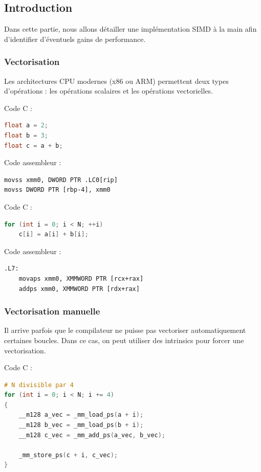\subsection{Introduction}

Dans cette partie, nous allons détailler une implémentation SIMD à la main afin d'identifier d'éventuels gains de performance.

\subsubsection{Vectorisation}

Les architectures CPU modernes (x86 ou ARM) permettent deux types d'opérations :
les opérations scalaires et les opérations vectorielles.

Code C :

\begin{lstlisting}[language=C]
float a = 2;
float b = 3;
float c = a + b;
\end{lstlisting}

Code assembleur :

\begin{lstlisting}
movss xmm0, DWORD PTR .LC0[rip]
movss DWORD PTR [rbp-4], xmm0
\end{lstlisting}

Code C :

\begin{lstlisting}[language=C]
for (int i = 0; i < N; ++i)
    c[i] = a[i] + b[i];
\end{lstlisting}

Code assembleur :

\begin{lstlisting}
.L7:
    movaps xmm0, XMMWORD PTR [rcx+rax]
    addps xmm0, XMMWORD PTR [rdx+rax]
\end{lstlisting}

\subsubsection{Vectorisation manuelle}

Il arrive parfois que le compilateur ne puisse pas vectoriser automatiquement certaines boucles. Dans ce cas, on peut utiliser des intrinsics pour forcer une vectorisation.

Code C :

\begin{lstlisting}[language=C]
# N divisible par 4
for (int i = 0; i < N; i += 4)
{
    __m128 a_vec = _mm_load_ps(a + i);
    __m128 b_vec = _mm_load_ps(b + i);
    __m128 c_vec = _mm_add_ps(a_vec, b_vec);

    _mm_store_ps(c + i, c_vec);
}
\end{lstlisting}

